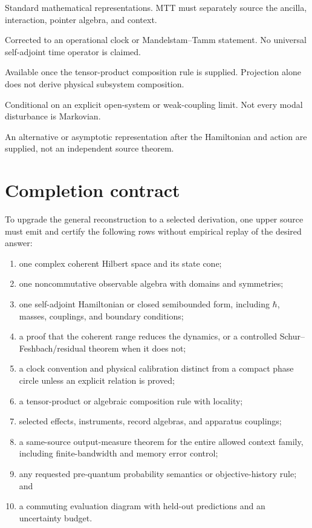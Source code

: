 \documentclass[11pt]{article}
\theoremstyle{definition}
\theoremstyle{remark}
\let\MTToriginalitem\item
\renewcommand{\item}{\par\MTToriginalitem}
\begin{document}
\begin{description}[leftmargin=3.3cm,style=nextline]
\item[POVMs and dilations]
Standard mathematical representations.  MTT must separately source the
ancilla, interaction, pointer algebra, and context.

\item[Time uncertainty]
Corrected to an operational clock or Mandelstam--Tamm statement.  No
universal self-adjoint time operator is claimed.

\item[Entanglement]
Available once the tensor-product composition rule is supplied.  Projection
alone does not derive physical subsystem composition.

\item[Lindblad dynamics]
Conditional on an explicit open-system or weak-coupling limit.  Not every
modal disturbance is Markovian.

\item[Path-integral language]
An alternative or asymptotic representation after the Hamiltonian and
action are supplied, not an independent source theorem.
\end{description}

\section{Completion contract}
\label{sec:completion}

To upgrade the general reconstruction to a selected derivation, one upper
source must emit and certify the following rows without empirical replay of
the desired answer:
\begin{enumerate}[leftmargin=2em]
\item one complex coherent Hilbert space and its state cone;
\item one noncommutative observable algebra with domains and symmetries;
\item one self-adjoint Hamiltonian or closed semibounded form, including
      \(\hbar\), masses, couplings, and boundary conditions;
\item a proof that the coherent range reduces the dynamics, or a controlled
      Schur--Feshbach/residual theorem when it does not;
\item a clock convention and physical calibration distinct from a compact
      phase circle unless an explicit relation is proved;
\item a tensor-product or algebraic composition rule with locality;
\item selected effects, instruments, record algebras, and apparatus
      couplings;
\item a same-source output-measure theorem for the entire allowed context
      family, including finite-bandwidth and memory error control;
\item any requested pre-quantum probability semantics or objective-history
      rule; and
\item a commuting evaluation diagram with held-out predictions and an
      uncertainty budget.
\end{enumerate}
\end{document}
